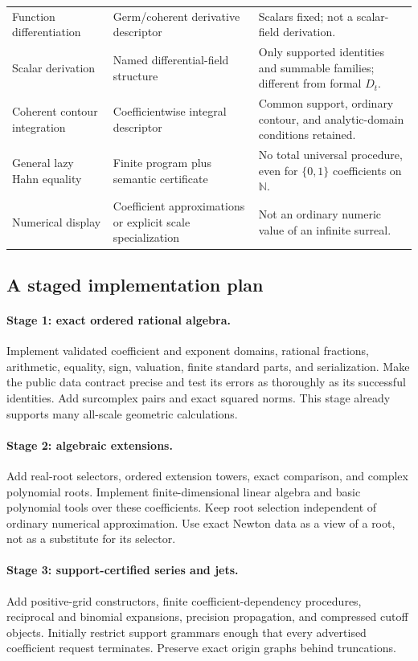 \documentclass[11pt,letterpaper]{article}
\theoremstyle{definition}
\newcommand{\N}{\mathbb N}
\numberwithin{equation}{section}
\begin{document}
\begin{center}
\begin{longtable}{@{}L{0.23\textwidth}L{0.32\textwidth}L{0.36\textwidth}@{}}
Function differentiation & Germ/coherent derivative descriptor & Scalars fixed; not a scalar-field derivation.\\[0.35em]
Scalar derivation & Named differential-field structure & Only supported identities and summable families; different from formal $D_t$.\\[0.35em]
Coherent contour integration & Coefficientwise integral descriptor & Common support, ordinary contour, and analytic-domain conditions retained.\\[0.35em]
General lazy Hahn equality & Finite program plus semantic certificate & No total universal procedure, even for $\{0,1\}$ coefficients on $\N$.\\[0.35em]
Numerical display & Coefficient approximations or explicit scale specialization & Not an ordinary numeric value of an infinite surreal.\\
\bottomrule
\end{longtable}
\end{center}

\subsection{A staged implementation plan}
\paragraph{Stage 1: exact ordered rational algebra.}
Implement validated coefficient and exponent domains, rational fractions, arithmetic, equality, sign, valuation, finite standard parts, and serialization. Make the public data contract precise and test its errors as thoroughly as its successful identities. Add surcomplex pairs and exact squared norms. This stage already supports many all-scale geometric calculations.

\paragraph{Stage 2: algebraic extensions.}
Add real-root selectors, ordered extension towers, exact comparison, and complex polynomial roots. Implement finite-dimensional linear algebra and basic polynomial tools over these coefficients. Keep root selection independent of ordinary numerical approximation. Use exact Newton data as a view of a root, not as a substitute for its selector.

\paragraph{Stage 3: support-certified series and jets.}
Add positive-grid constructors, finite coefficient-dependency procedures, reciprocal and binomial expansions, precision propagation, and compressed cutoff objects. Initially restrict support grammars enough that every advertised coefficient request terminates. Preserve exact origin graphs behind truncations.
\end{document}
